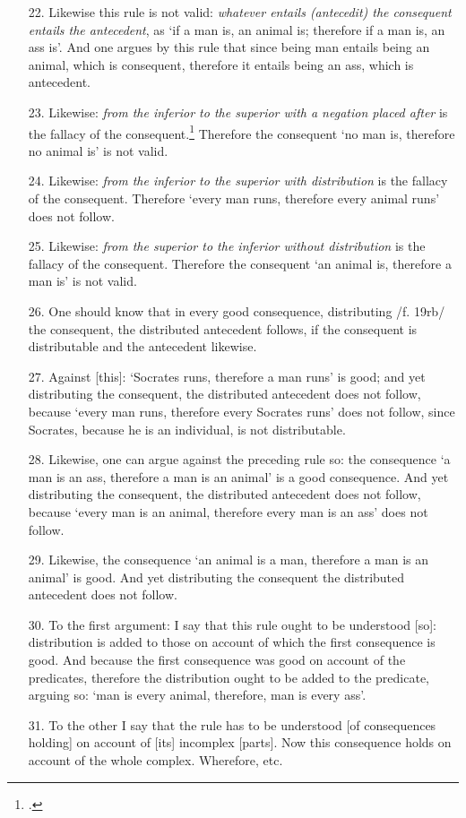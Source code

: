 \begin{itemize}
\item[22.] Likewise this rule is not valid: \textit{whatever entails (antecedit) the consequent entails the antecedent}, as `if a man is, an animal is; therefore if a man is, an ass is'. And one argues by this rule that since being man entails being an animal, which is consequent, therefore it entails being an ass, which is antecedent.
\item[23.] Likewise: \textit{from the inferior to the superior with a negation placed after} is the fallacy of the consequent.\footnote{\cite[p. 210.21]{BurleyDPAL}.} Therefore the consequent `no man is, therefore no animal is' is not valid.
\item[24.] Likewise: \textit{from the inferior to the superior with distribution} is the fallacy of the consequent. Therefore `every man runs, therefore every animal runs' does not follow.
\item[25.] Likewise: \textit{from the superior to the inferior without distribution} is the fallacy of the consequent. Therefore the consequent `an animal is, therefore a man is' is not valid.
\item[26.] One should know that in every good consequence, distributing /f. 19rb/ the consequent, the distributed antecedent follows, if the consequent is distributable and the antecedent likewise.
\item[27.] Against [this]: `Socrates runs, therefore a man runs' is good; and yet distributing the consequent, the distributed antecedent does not follow, because `every man runs, therefore every Socrates runs' does not follow, since Socrates, because he is an individual, is not distributable.
\item[28.] Likewise, one can argue against the preceding rule so: the consequence `a man is an ass, therefore a man is an animal' is a good consequence. And yet distributing the consequent, the distributed antecedent does not follow, because `every man is an animal, therefore every man is an ass' does not follow.
\item[29.] Likewise, the consequence `an animal is a man, therefore a man is an animal' is good. And yet distributing the consequent the distributed antecedent does not follow.
\item[30.] To the first argument: I say that this rule ought to be understood [so]: distribution is added to those on account of which the first consequence is good. And because the first consequence was good on account of the predicates, therefore the distribution ought to be added to the predicate, arguing so: `man is every animal, therefore, man is every ass'.
\item[31.] To the other I say that the rule has to be understood [of consequences holding] on account of [its] incomplex [parts]. Now this consequence holds on account of the whole complex. Wherefore, etc.
\end{itemize}
